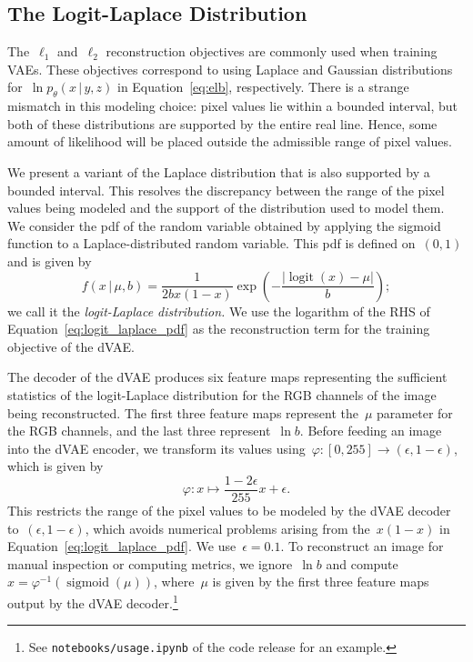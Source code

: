 \documentclass{article}
\newcommand{\given}{\,|\,}{}
\begin{document}
\subsection{The Logit-Laplace Distribution}
\label{sec:dvae_logit_laplace}

The~$\ell_1$ and~$\ell_2$ reconstruction objectives are commonly used when training VAEs. These objectives correspond to using Laplace and Gaussian distributions for~$\ln p_\theta(x \given y, z)$ in Equation~\ref{eq:elb}, respectively. There is a strange mismatch in this modeling choice: pixel values lie within a bounded interval, but both of these distributions are supported by the entire real line. Hence, some amount of likelihood will be placed outside the admissible range of pixel values.

We present a variant of the Laplace distribution that is also supported by a bounded interval. This resolves the discrepancy between the range of the pixel values being modeled and the support of the distribution used to model them. We consider the pdf of the random variable obtained by applying the sigmoid function to a Laplace-distributed random variable. This pdf is defined on~$(0, 1)$ and is given by
\begin{equation}
    f(x \given \mu, b) = \frac{1}{2b x (1 - x)} \exp\left(-\frac{|\operatorname{logit}(x) - \mu|}{b}\right);
    \label{eq:logit_laplace_pdf}
\end{equation}
we call it the \emph{logit-Laplace distribution.} We use the logarithm of the RHS of Equation~\ref{eq:logit_laplace_pdf} as the reconstruction term for the training objective of the dVAE.

The decoder of the dVAE produces six feature maps representing the sufficient statistics of the logit-Laplace distribution for the RGB channels of the image being reconstructed. The first three feature maps represent the~$\mu$ parameter for the RGB channels, and the last three represent~$\ln b$. Before feeding an image into the dVAE encoder, we transform its values using~$\varphi: [0, 255] \to (\epsilon, 1 - \epsilon)$, which is given by
\begin{equation}
    \varphi : x \mapsto \frac{1 - 2\epsilon}{255} x + \epsilon.
\end{equation}
This restricts the range of the pixel values to be modeled by the dVAE decoder to~$(\epsilon, 1 - \epsilon)$, which avoids numerical problems arising from the~$x (1 - x)$ in Equation~\ref{eq:logit_laplace_pdf}. We use~$\epsilon = 0.1$. To reconstruct an image for manual inspection or computing metrics, we ignore~$\ln b$ and compute~$\hat{x} = \varphi^{-1}(\operatorname{sigmoid}(\mu))$, where~$\mu$ is given by the first three feature maps output by the dVAE decoder.\footnote{See \texttt{notebooks/usage.ipynb} of the code release for an example.}
\end{document}
